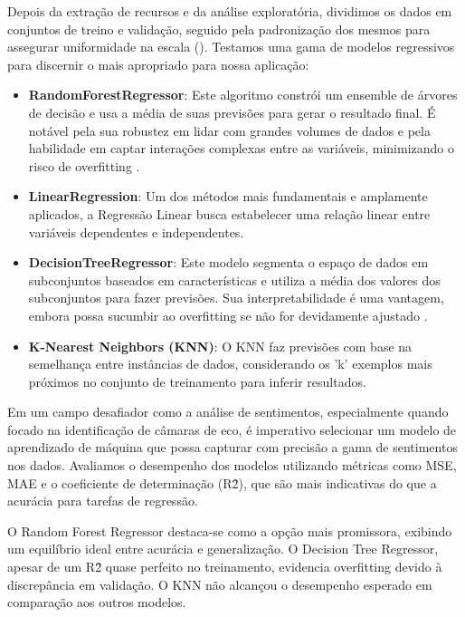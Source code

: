 Depois da extração de recursos e da análise exploratória, dividimos os dados em conjuntos de treino e validação, seguido pela padronização dos mesmos para assegurar uniformidade na escala (\cite{2000_Jain}). Testamos uma gama de modelos regressivos para discernir o mais apropriado para nossa aplicação:

\begin{itemize}
\item \textbf{RandomForestRegressor}: Este algoritmo constrói um ensemble de árvores de decisão e usa a média de suas previsões para gerar o resultado final. É notável pela sua robustez em lidar com grandes volumes de dados e pela habilidade em captar interações complexas entre as variáveis, minimizando o risco de overfitting \cite[5-32]{2001_Breiman}.
\item \textbf{LinearRegression}: Um dos métodos mais fundamentais e amplamente aplicados, a Regressão Linear busca estabelecer uma relação linear entre variáveis dependentes e independentes.
\item \textbf{DecisionTreeRegressor}: Este modelo segmenta o espaço de dados em subconjuntos baseados em características e utiliza a média dos valores dos subconjuntos para fazer previsões. Sua interpretabilidade é uma vantagem, embora possa sucumbir ao overfitting se não for devidamente ajustado \cite[81-106]{1986_Quinlan}.
\item \textbf{K-Nearest Neighbors (KNN)}: O KNN faz previsões com base na semelhança entre instâncias de dados, considerando os 'k' exemplos mais próximos no conjunto de treinamento para inferir resultados.
\end{itemize}

Em um campo desafiador como a análise de sentimentos, especialmente quando focado na identificação de câmaras de eco, é imperativo selecionar um modelo de aprendizado de máquina que possa capturar com precisão a gama de sentimentos nos dados. Avaliamos o desempenho dos modelos utilizando métricas como MSE, MAE e o coeficiente de determinação (R\^2), que são mais indicativas do que a acurácia para tarefas de regressão.

O Random Forest Regressor destaca-se como a opção mais promissora, exibindo um equilíbrio ideal entre acurácia e generalização. O Decision Tree Regressor, apesar de um R\^2 quase perfeito no treinamento, evidencia overfitting devido à discrepância em validação. O KNN não alcançou o desempenho esperado em comparação aos outros modelos.

